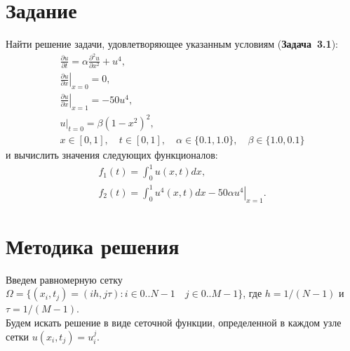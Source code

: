 \documentclass[a4paper,12pt]{article}
\newcommand{\UpdateMe}[1]{\textcolor{red}{#1}}
\newcommand{\University}{Московский государственный университет имени М.~В.~Ломоносова}
\newcommand{\Department}{Кафедра \UpdateMe{НАЗВАНИЕ-КАФЕДРЫ}}
\newcommand{\Student}{\UpdateMe{ИМЯ-СТУДЕНТА}}
\newcommand{\GroupNum}{\UpdateMe{НОМЕР}}
\newcommand{\Seminar}{\UpdateMe{НАЗВАНИЕ-ПРАКТИКУМА}}
\begin{document}

\section*{Задание}
Найти решение задачи, удовлетворяющее указанным условиям ({\bfseries Задача~3.1}):
\begin{gather*}
  \frac{\partial u}{\partial t}=\alpha \frac{\partial^2 u}{\partial x^2} + u^4,\\
  \left.\frac{\partial u}{\partial x}\right\vert_{x=0}=0,\\
  \left.\frac{\partial u}{\partial x}\right\vert_{x=1}=-50u^4,\\
  \left.u\right\vert_{t=0}=\beta(1-x^2)^2,\\
  x \in [0, 1], \quad t \in [0, 1], \quad \alpha \in \{0.1, 1.0\}, \quad \beta \in \{1.0, 0.1\}
\end{gather*}
и вычислить значения следующих функционалов:
\begin{gather*}
  f_1(t) = \int_{0}^{1}{u(x, t) dx},\\
  f_2(t) = \int_{0}^{1}{u^4(x, t) dx} - 50\alpha\left.u^4\right\vert_{x=1}.
\end{gather*}

\section*{Методика решения}

Введем равномерную сетку \(\Omega=\{(x_{i}, t_{j})=(ih, j\tau): i \in 0..N-1 \quad j\in 0..M-1\}\), где \(h=1/(N-1)\) и \(\tau=1/(M-1)\).\\
Будем искать решение в виде сеточной функции, определенной в каждом узле сетки \(u(x_{i},t_{j})=u_{i}^{j}\).
\end{document}
